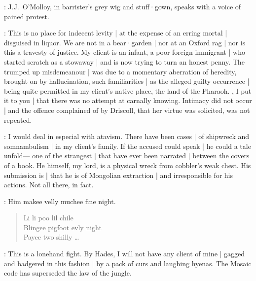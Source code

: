 :
J.J.~O'Molloy,
in barrister's grey wig and stuff·gown,
speaks with a voice of pained protest.

\JJOM:
This is no place for indecent levity |
at the expense of an erring mortal |
disguised in liquor.
We are not in a bear·garden |
nor at an Oxford rag |
nor is this a travesty of justice.
My client is an infant,
a poor foreign immigrant |
who started scratch as a stowaway |
and is now trying to turn an honest penny.
The trumped up misdemeanour |
was due to a momentary aberration of heredity,
brought on by hallucination,
such familiarities |
as the alleged guilty occurrence |
being quite permitted in my client's native place,
the land of the Pharaoh.
,
I put it to you |
that there was no attempt at carnally knowing.
Intimacy did not occur |
and the offence complained of by Driscoll,
that her virtue was solicited,
was not repeated.

\begin{omitted}
\JJOM:
I would deal in especial with atavism.
There have been cases |
of shipwreck and somnambulism |
in my client's family.
If the accused could speak |
he could a tale unfold---%
one of the strangest |
that have ever been narrated |
between the covers of a book.
He himself,
my lord,
is a physical wreck from cobbler's weak chest.
His submission is |
that he is of Mongolian extraction |
and irresponsible for his actions.
Not all there,
in fact.

\Bloom:
Him makee velly muchee fine night.
\begin{verse}
    Li li poo lil chile\\
    Blingee pigfoot evly night\\
    Payee two shilly \ldots
\end{verse}


\JJOM:
This is a lonehand fight.
By Hades,
I will not have any client of mine |
gagged and badgered in this fashion |
by a pack of curs and laughing hyenas.
The Mosaic code has superseded the law of the jungle.
\end{omitted}


